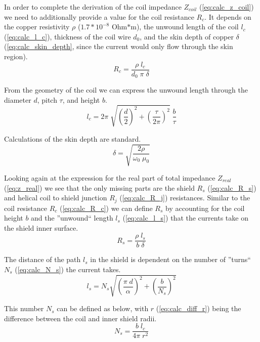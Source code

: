 In order to complete the derivation of the coil impedance $Z_{coil}$ (\ref{eq:calc_z_coil}) we need to additionally provide a value for the coil resistance $R_c$. It depends on the copper resistivity $\rho$ ($1.7 * 10^{-8}$ Ohm$*$m), the unwound length of the coil $l_c$ (\ref{eq:calc_l_c}), thickness of the coil wire $d_0$, and the skin depth of copper $\delta$ (\ref{eq:calc_skin_depth}, since the current would only flow through the skin region).
\begin{equation}
	R_c = \frac{\rho \; l_c}{d_0 \; \pi \; \delta}
	\label{eq:calc_R_c}
\end{equation}

From the geometry of the coil we can express the unwound length through the diameter $d$, pitch $\tau$, and height $b$.
\begin{equation}
	l_c = 2\pi \; \sqrt{\left( \frac{d}{2} \right)^2 + \left( \frac{\tau}{2\pi} \right)^2} \; \frac{b}{\tau}
	\label{eq:calc_l_c}
\end{equation}

Calculations of the skin depth are standard.
\begin{equation}
	\delta = \sqrt{\frac{2 \rho}{\omega_0 \; \mu_0}}
	\label{eq:calc_skin_depth}
\end{equation}

Looking again at the expression for the real part of total impedance $Z_{real}$ (\ref{eq:z_real}) we see that the only missing parts are the shield $R_s$ (\ref{eq:calc_R_s}) and helical coil to shield junction $R_j$ (\ref{eq:calc_R_j}) resistances. Similar to the coil resistance $R_c$ (\ref{eq:calc_R_c}) we can define $R_s$ by accounting for the coil height $b$ and the ''unwound`` length $l_s$ (\ref{eq:calc_l_s}) that the currents take on the shield inner surface.
\begin{equation}
	R_s = \frac{\rho \; l_s}{b \; \delta}
	\label{eq:calc_R_s}
\end{equation}

The distance of the path $l_s$ in the shield is dependent on the number of ''turns`` $N_s$ (\ref{eq:calc_N_s}) the current takes.
\begin{equation}
	l_s = N_s \sqrt{\left( \frac{\pi \; d}{\alpha} \right)^2 + \left( \frac{b}{N_s} \right)^2}
	\label{eq:calc_l_s}
\end{equation}

This number $N_s$ can be defined as below, with $r$ (\ref{eq:calc_diff_r}) being the difference between the coil and inner shield radii.
\begin{equation}
	N_s = \frac{b \; l_c}{4\pi \; r^2}
	\label{eq:calc_N_s}
\end{equation}

